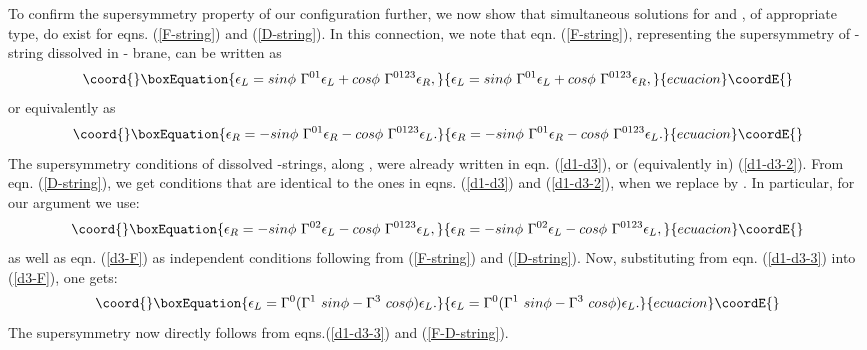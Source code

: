 \documentclass[a4paper,12pt]{article}
\begin{document}
To confirm the \coordHE{} supersymmetry property of our configuration 
further, we now show that 
simultaneous solutions for \coordHE{} and \coordHE{}, 
of appropriate type, do exist for eqns. (\ref{F-string}) 
and (\ref{D-string}). In this connection, we note that
eqn. (\ref{F-string}), representing 
the supersymmetry of \coordHE{}-string dissolved in \coordHE{}-
brane, can be written as 
\begin{equation}\coord{}\boxEquation{
\epsilon_L = sin \phi~\Gamma^{0 1} \epsilon_L 
            + cos \phi~\Gamma^{0 1 2 3}\epsilon_R,
\label{d3-F}
}{
\epsilon_L = sin \phi~\Gamma^{0 1} \epsilon_L 
            + cos \phi~\Gamma^{0 1 2 3}\epsilon_R,
}{ecuacion}\coordE{}\end{equation}
or equivalently as
\begin{equation}\coord{}\boxEquation{
\epsilon_R = - sin \phi~\Gamma^{0 1} \epsilon_R 
             - cos \phi~\Gamma^{0 1 2 3}\epsilon_L.
\label{d3-F-2}
}{
\epsilon_R = - sin \phi~\Gamma^{0 1} \epsilon_R 
             - cos \phi~\Gamma^{0 1 2 3}\epsilon_L.
}{ecuacion}\coordE{}\end{equation}
The supersymmetry conditions of dissolved \coordHE{}-strings, along \coordHE{},
were already written in eqn. (\ref{d1-d3}), or (equivalently in) 
(\ref{d1-d3-2}).
From eqn. (\ref{D-string}), we get conditions that are 
identical to the ones in eqns. (\ref{d1-d3}) and (\ref{d1-d3-2}),
when we replace \coordHE{} by \coordHE{}.
In particular, for our argument we use:
\begin{equation}\coord{}\boxEquation{ 
\epsilon_R = - sin\phi ~\Gamma^{0 2} \epsilon_L 
              - cos \phi ~\Gamma^{0 1 2 3} \epsilon_L,
\label{d1-d3-3}
}{ 
\epsilon_R = - sin\phi ~\Gamma^{0 2} \epsilon_L 
              - cos \phi ~\Gamma^{0 1 2 3} \epsilon_L,
}{ecuacion}\coordE{}\end{equation}
as well as eqn. (\ref{d3-F}) as independent conditions
following from (\ref{F-string}) and (\ref{D-string}). Now, substituting 
\coordHE{} from eqn. (\ref{d1-d3-3}) into
(\ref{d3-F}), one gets:
\begin{equation}\coord{}\boxEquation{
\epsilon_L = \Gamma^0(\Gamma^1~sin\phi - \Gamma^3~cos\phi)\epsilon_L.
\label{F-D-string}
}{
\epsilon_L = \Gamma^0(\Gamma^1~sin\phi - \Gamma^3~cos\phi)\epsilon_L.
}{ecuacion}\coordE{}\end{equation}
The \coordHE{} supersymmetry now directly follows from eqns.(\ref{d1-d3-3})
and (\ref{F-D-string}). 
\end{document}
